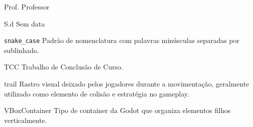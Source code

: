 \begin{siglas}
  \item[Prof.] Professor
  \item[S.d] Sem data
  \item[\texttt{snake\_case}] Padrão de nomenclatura com palavras minúsculas separadas por sublinhado.
  \item[TCC] Trabalho de Conclusão de Curso.
  \item[trail] Rastro visual deixado pelos jogadores durante a movimentação, geralmente utilizado como elemento de colisão e estratégia no gameplay.
  \item[VBoxContainer] Tipo de container da Godot que organiza elementos filhos verticalmente.
\end{siglas}
